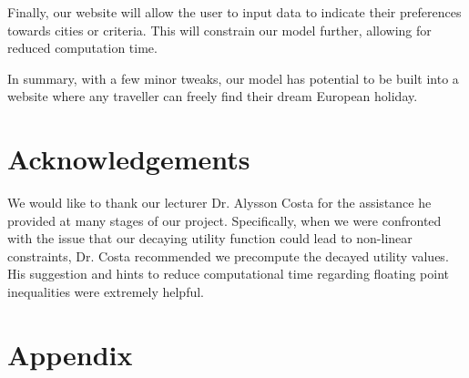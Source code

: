 \documentclass[12pt]{article}
\begin{document}
Finally, our website will allow the user to input data to indicate their preferences towards cities or criteria. This will constrain our model further, allowing for reduced computation time.

In summary, with a few minor tweaks, our model has potential to be built into a website where any traveller can freely find their dream European holiday.



\section{Acknowledgements}
\label{sec:acknow}


We would like to thank our lecturer Dr. Alysson Costa for the assistance he provided at many stages of our project. Specifically, when we were confronted with the issue that our decaying utility function could lead to non-linear constraints, Dr. Costa recommended we precompute the decayed utility values. His suggestion and hints to reduce computational time regarding floating point inequalities were extremely helpful.


\pagebreak


\section{Appendix}
\label{sec:appen}
\end{document}
